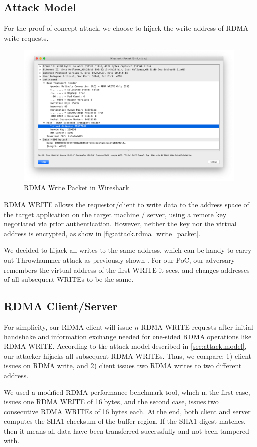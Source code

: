 \subsection{Attack Model}
\label{sec:attack.model}

For the proof-of-concept attack, we choose to hijack the write address of RDMA write requests.

\begin{figure}[h]
    \centering
    \includegraphics[width=0.5\textwidth - 5pt]{fig/rdma_write_packet_wireshark}
    \caption{RDMA Write Packet in Wireshark}
    \label{fig:attack.rdma_write_packet}
\end{figure}

RDMA WRITE allows the requestor/client to write data to the address space of the target application
on the target machine / server, using a remote key negotiated via prior authentication. However,
neither the key nor the virtual address is encrypted, as show in \autoref{fig:attack.rdma_write_packet}.

We decided to hijack all writes to the same address, which can be handy to carry out Throwhammer attack
as previously shown \cite{216055}.
For our PoC, our adversary remembers the virtual address of the first WRITE it sees,
and changes addresses of all subsequent WRITEs to be the same.

\subsection{RDMA Client/Server}
\label{sec:attack.rdma_app}

For simplicity, our RDMA client will issue $n$ RDMA WRITE requests after initial handshake and
information exchange needed for one-sided RDMA operations like RDMA WRITE. According to the attack model
described in \autoref{sec:attack.model}, our attacker hijacks all subsequent RDMA WRITEs. Thus, we compare:
1) client issues on RDMA write, and 2) client issues two RDMA writes to two different address.

We used a modified RDMA performance benchmark tool, which in the first case, issues one RDMA WRITE of 16 bytes,
and the second case, issues two consecutive RDMA WRITEs of 16 bytes each. At the end, both client and server
computes the SHA1 checksum of the buffer region. If the SHA1 digest matches, then it means all data have been
transferred successfully and not been tampered with.

